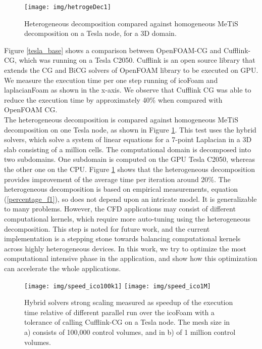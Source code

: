 \documentclass[3p,times]{elsarticle}
\begin{document}
\begin{figure}[h!]
\begin{center}
\texttt{[image: img/hetrogeDec1]} 
\caption{Heterogeneous decomposition compared against homogeneous MeTiS decomposition on a Tesla node, for a  3D domain. }
\label{heterodecom}
\end{center}
\end{figure}

Figure \ref{tesla_base} shows a comparison between OpenFOAM-CG and Cufflink-CG, which was running on a Tesla C2050. Cufflink is an open source library that extends the CG and BiCG solvers of OpenFOAM library to be executed on GPU. We measure the execution time per one step running of icoFoam and laplacianFoam as shown in the x-axis. We observe that Cufflink CG  was able to reduce the execution time by approximately 40\% when compared with OpenFOAM CG. \\

The heterogeneous decomposition is compared against homogeneous MeTiS decomposition on one Tesla node, as shown in Figure \ref{heterodecom}. This test uses the hybrid solvers, which solve a system of linear equations for a 7-point Laplacian in a 3D slab consisting of a million cells. The computational domain is decomposed into two subdomains. One subdomain is computed on the GPU Tesla C2050, whereas the other one on the CPU. Figure  \ref{heterodecom}  shows that the heterogeneous decomposition provides improvement of the average time per iteration around 20\%. The heterogeneous decomposition is based on empirical measurements, equation (\ref{percentage_f1}), so does not depend upon an intricate model. It is generalizable to many problems. However, the CFD applications may consist of different computational kernels, which require more auto-tuning using the heterogeneous decomposition. This step is noted for future work, and the current implementation is a stepping stone towards balancing computational kernels across highly heterogeneous devices. In this work, we try to optimize the most computational intensive phase in the application, and show how this optimization can accelerate the whole applications.  \\

\begin{figure}[h!]
\begin{center}
\emph{} \texttt{[image: img/speed\_ico100k1]}
\emph{} \texttt{[image: img/speed\_ico1M]}
\caption{Hybrid solvers strong scaling measured as speedup of the execution time relative of different parallel run over the icoFoam with a tolerance of  calling Cufflink-CG on a Tesla node. The mesh size in a) consists of 100,000 control volumes, and in b) of 1 million control volumes. }
\label{icospeedup}
\end{center}
\end{figure}  
\end{document}
